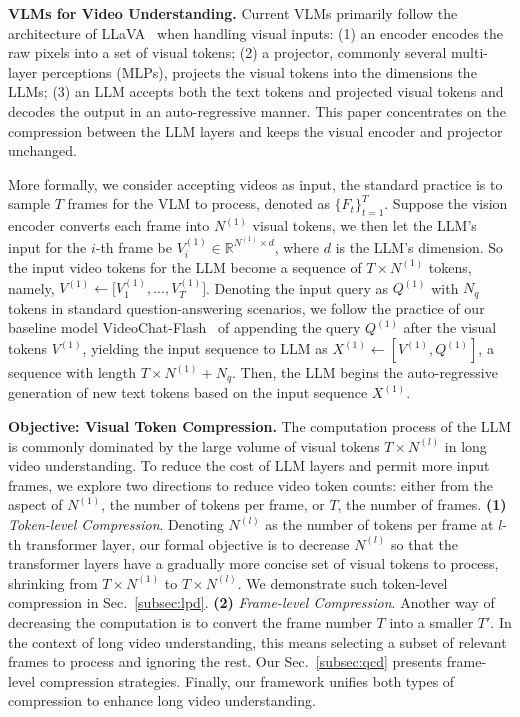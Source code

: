 \textbf{VLMs for Video Understanding.}\;\; Current VLMs primarily follow the architecture of LLaVA~\cite{liu2023visual} when handling visual inputs: (1) an encoder encodes the raw pixels into a set of visual tokens; (2) a projector, commonly several multi-layer perceptions (MLPs), projects the visual tokens into the dimensions the LLMs; (3) an LLM accepts both the text tokens and projected visual tokens and decodes the output in an auto-regressive manner. This paper concentrates on the compression between the LLM layers and keeps the visual encoder and projector unchanged.

More formally, we consider accepting videos as input, the standard practice is to sample $T$ frames for the VLM to process, denoted as $\{F_t\}_{t=1}^{T}$. Suppose the vision encoder converts each frame into $N^{(1)}$ visual tokens, we then let the LLM's input for the $i$-th frame be $V_i^{(1)}\in\mathbb{R}^{N^{(1)}\times d}$, where $d$ is the LLM's dimension. So the input video tokens for the LLM become a sequence of $T\times N^{(1)}$ tokens, namely, $V^{(1)}\xleftarrow{}\bigl[V_1^{(1)}, ..., V_T^{(1)}]$. Denoting the input query as $Q^{(1)}$ with $N_q$ tokens in standard question-answering scenarios, we follow the practice of our baseline model VideoChat-Flash~\cite{li2024videochat} of appending the query $Q^{(1)}$ after the visual tokens $V^{(1)}$, yielding the input sequence to LLM as $X^{(1)}\xleftarrow{}[V^{(1)}, Q^{(1)}]$, a sequence with length $T\times N^{(1)} + N_q$. Then, the LLM begins the auto-regressive generation of new text tokens based on the input sequence $X^{(1)}$.

\textbf{Objective: Visual Token Compression.}\;\; The computation process of the LLM is commonly dominated by the large volume of visual tokens $T\times N^{(l)}$ in long video understanding. To reduce the cost of LLM layers and permit more input frames, we explore two directions to reduce video token counts: either from the aspect of $N^{(1)}$, the number of tokens per frame, or $T$, the number of frames. \textbf{(1)} \emph{Token-level Compression}. Denoting $N^{(l)}$ as the number of tokens per frame at $l$-th transformer layer, our formal objective is to decrease $N^{(l)}$ so that the transformer layers have a gradually more concise set of visual tokens to process, shrinking from $T\times N^{(1)}$ to $T\times N^{(l)}$. We demonstrate such token-level compression in Sec.~\ref{subsec:lpd}.  \textbf{(2)} \emph{Frame-level Compression}. Another way of decreasing the computation is to convert the frame number $T$ into a smaller $T'$. In the context of long video understanding, this means selecting a subset of relevant frames to process and ignoring the rest. Our Sec.~\ref{subsec:qcd} presents frame-level compression strategies. Finally, our framework unifies both types of compression to enhance long video understanding.

